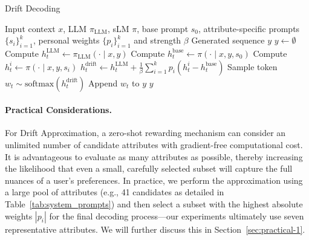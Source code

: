 \begin{algorithm}[t]
\caption{Drift Decoding}
\label{alg:drift-decoding}
\begin{algorithmic}[1]
\Require Input context $x$, LLM $\pi_{\text{LLM}}$, sLM  $\pi$, base prompt $s_0$, attribute-specific prompts $\{s_i\}_{i=1}^k$, personal weights $\{p_i\}_{i=1}^k$ and strength $\beta$
\Ensure Generated sequence $y$
\State $y \gets \emptyset$
    \State Compute $h^{\text{LLM}}_t \gets \pi_{\text{LLM}}(\cdot \mid x,y)$
    \State Compute $h^{\text{base}}_t \gets \pi(\cdot \mid x,y, s_0)$
        \State Compute $h^i_t \gets \pi(\cdot \mid x,y, s_i)$
    \EndFor
    \State $h^{\text{drift}}_t \gets h^{\text{LLM}}_t + \frac{1}{\beta}\sum_{i=1}^k p_i (h^i_t - h^{\text{base}}_t)$
    \State Sample token $w_t \sim \text{softmax}(h^{\text{drift}}_t)$
    \State Append $w_t$ to $y$
\EndWhile
\State \Return $y$
\end{algorithmic}
\end{algorithm}


\paragraph{Practical Considerations.}
For Drift Approximation, a zero-shot rewarding mechanism can consider an unlimited number of candidate attributes with gradient-free computational cost. It is advantageous to evaluate as many attributes as possible, thereby increasing the likelihood that even a small, carefully selected subset will capture the full nuances of a user's preferences. In practice, we perform the approximation using a large pool of attributes (e.g., 41 candidates as detailed in Table~\ref{tab:system_prompts}) and then select a subset with the highest absolute weights $|p_i|$ for the final decoding process—our experiments ultimately use seven representative attributes. We will further discuss this in Section~\ref{sec:practical-1}.


